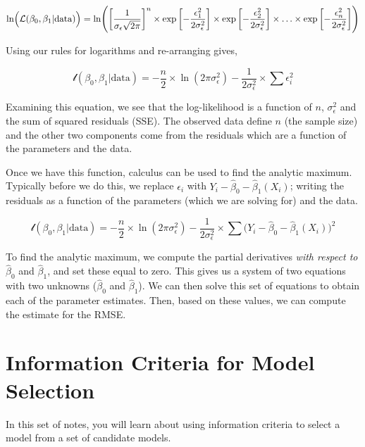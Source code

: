 \documentclass[]{book}
\begin{document}
\[
\begin{split}
\ln \Bigl(\mathcal{L}(\beta_0, \beta_1 | \mathrm{data})\Bigr) &= \ln \Biggl( \left[ \frac{1}{\sigma_{\epsilon}\sqrt{2\pi}} \right]^n \times \exp\left[-\frac{\epsilon_1^2}{2\sigma^2_{\epsilon}}\right] \times \exp\left[-\frac{\epsilon_2^2}{2\sigma^2_{\epsilon}}\right] \times \ldots \times \exp\left[-\frac{\epsilon_n^2}{2\sigma^2_{\epsilon}}\right] \Biggr) \\
\end{split}
\]

Using our rules for logarithms and re-arranging gives,

\[
\mathcal{l}(\beta_0, \beta_1 | \mathrm{data}) = -\frac{n}{2} \times \ln (2\pi\sigma^2_{\epsilon}) - \frac{1}{2\sigma^2_{\epsilon}} \times \sum \epsilon_i^2
\]

Examining this equation, we see that the log-likelihood is a function of \(n\), \(\sigma^2_{\epsilon}\) and the sum of squared residuals (SSE). The observed data define \(n\) (the sample size) and the other two components come from the residuals which are a function of the parameters and the data.

Once we have this function, calculus can be used to find the analytic maximum. Typically before we do this, we replace \(\epsilon_i\) with \(Y_i - \hat\beta_0 - \hat\beta_1(X_i)\); writing the residuals as a function of the parameters (which we are solving for) and the data.

\[
\mathcal{l}(\beta_0, \beta_1 | \mathrm{data}) = -\frac{n}{2} \times \ln (2\pi\sigma^2_{\epsilon}) - \frac{1}{2\sigma^2_{\epsilon}} \times \sum \bigg(Y_i - \hat\beta_0 - \hat\beta_1(X_i)\bigg)^2
\]

To find the analytic maximum, we compute the partial derivatives \emph{with respect to} \(\hat\beta_0\) and \(\hat\beta_1\), and set these equal to zero. This gives us a system of two equations with two unknowns (\(\hat\beta_0\) and \(\hat\beta_1\)). We can then solve this set of equations to obtain each of the parameter estimates. Then, based on these values, we can compute the estimate for the RMSE.

\hypertarget{information-criteria-for-model-selection}{%
\chapter{Information Criteria for Model Selection}\label{information-criteria-for-model-selection}}

In this set of notes, you will learn about using information criteria to select a model from a set of candidate models.
\end{document}
